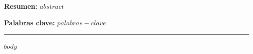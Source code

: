 \documentclass[10pt,a4paper]{article}
\begin{document}
\thispagestyle{primera}

\par\vspace{3pt}
\vspace{8pt}
\par\vspace{2pt}
\par\vspace{12pt}

\noindent\begin{minipage}{\linewidth}
\setlength{\parindent}{1.5em}\small\justifying
\noindent\textbf{Resumen:} $abstract$
\par\vspace{6pt}
\noindent\textbf{Palabras clave:} $palabras-clave$
\end{minipage}
\par\vspace{6pt}\noindent\rule{\linewidth}{0.4pt}\vspace{2pt}

$body$
\end{document}
